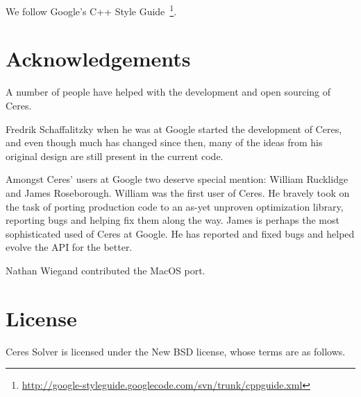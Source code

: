 We follow Google's C++ Style Guide~\footnote{\url{http://google-styleguide.googlecode.com/svn/trunk/cppguide.xml}}.

\section{Acknowledgements}
A number of people have helped with the development and open sourcing of Ceres. 

Fredrik Schaffalitzky when he was at Google started the development of Ceres, and even though much has changed since then, many of the ideas from his original design are still present in the current code.

Amongst Ceres' users at Google two deserve special mention: William Rucklidge and James Roseborough. William was the first user of Ceres. He bravely took on the task of porting production code to an as-yet unproven optimization library, reporting bugs and helping fix them along the way. James is perhaps the most sophisticated used of Ceres at Google. He has reported and fixed bugs and helped evolve the API for the better.

Nathan Wiegand contributed the MacOS port.
\clearpage

\section{License}
Ceres Solver is licensed under the New BSD license, whose terms are as follows.

